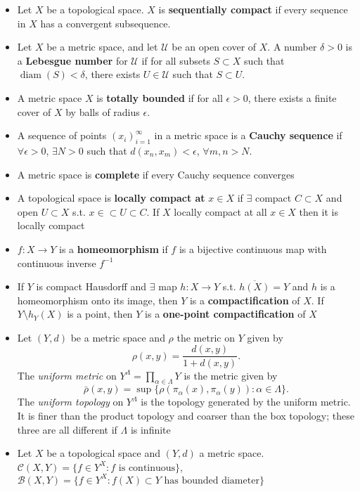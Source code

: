 \documentclass[frenchspacing,9pt,landscape,a4paper]{article}
\DeclareMathOperator{\diam}{diam}
\theoremstyle{remark}
\begin{document}
\begin{multicols}{4}
\begin{itemize}
\item Let $X$ be a topological space.  $X$ is \textbf{sequentially compact} if every sequence in  $X$ has a
    convergent subsequence.
\item Let $X$ be a metric space, and let  $\mathcal{U}$ be an open cover of  $X$. A number  $\delta>0$ is a
    \textbf{Lebesgue number} for $\mathcal{U}$ if for all subsets  $S\subset X$ such that
    $\diam(S)<\delta$, there exists  $U\in\mathcal{U}$ such that  $S\subset U$.
\item A metric space $X$ is \textbf{totally bounded} if for all $\epsilon>0$, there exists a finite cover of
     $X$ by balls of radius  $\epsilon$.
\item A sequence of points $(x_i)_{i=1}^{\infty}$ in a metric space is a \textbf{Cauchy sequence} if $\forall \epsilon > 0$, $\exists N > 0$ such that $d(x_n, x_m) < \epsilon$, $\forall m,n > N$.
\item A metric space is \textbf{complete} if every Cauchy sequence converges
\item A topological space is \textbf{locally compact at} $x\in X$ if  $\exists$ compact  $C\subset X$ and
    open  $U\subset X$ s.t.  $x\in\subset U\subset C$. If $X$ locally compact at all  $x\in X$ then it is
    locally compact
\item $f:X\to Y$ is a \textbf{homeomorphism} if  $f$ is a bijective continuous map with continuous inverse
    $f^{-1}$
\item If $Y$ is compact Hausdorff and  $\exists$ map  $h:X\to Y$ s.t.  $\overline{h(X)}=Y$ and  $h$ is a
    homeomorphism onto its image, then  $Y$ is a \textbf{compactification} of $X$. If  $Y\setminus h_Y(X)$
    is a point, then  $Y$ is a \textbf{one-point compactification} of  $X$
\item Let $(Y,d)$ be a metric space and $\rho$ the metric on $Y$ given by
\[ \rho(x,y) = \frac{d(x,y)}{1 + d(x,y)}. \]
The \emph{uniform metric} on $Y^{\Lambda} = \prod_{\alpha \in \Lambda} Y$ is the metric given by
\[ \bar{\rho}(x,y) = \sup\{\rho(\pi_{\alpha}(x), \pi_{\alpha}(y)) : \alpha \in \Lambda\}. \]
The \emph{uniform topology} on $Y^{\Lambda}$ is the topology generated by the uniform metric. It is finer
than the product topology and coarser than the box topology; these three are all different if $\Lambda$ is
infinite
\item Let $X$ be a topological space and  $(Y,d)$ a metric space.  $\mathcal{C}(X,Y)=\{f\in Y^X:f\text{ is
    continuous}\}$,  $\mathcal{B}(X,Y)=\{f\in Y^X:f(X)\subset Y\text{ has bounded diameter}\}$

\end{itemize}
\end{multicols}
\end{document}
